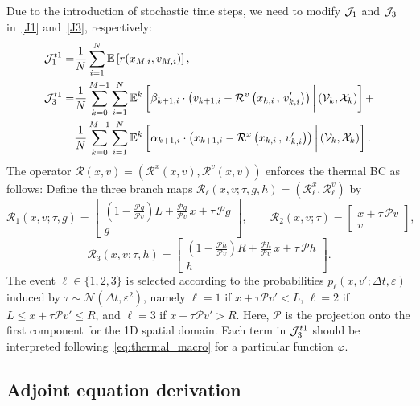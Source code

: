 \documentclass[12pt,nopreprintline]{elsarticle}
\begin{document}
Due to the introduction of stochastic time steps, we need to modify $\mathcal J_1$ and $\mathcal J_3$ in~\eqref{J1} and~\eqref{J3}, respectively:
\begin{align}
\mathcal J_1^{t1} = & \frac{1}{N} \sum_{i=1}^N  \mathbb{E} \left[ r( x_{M,i}, v_{M,i}) \right] \label{eq:J1_T1} ,  \\
\mathcal J_{3}^{t1} = & \frac{1}{N}\sum_{k=0}^{M-1} \sum_{i=1}^N  \mathbb{E}^k \left[  \beta_{k+1,i}  \cdot  \left( v_{k+1,i}   -  \mathcal{R}^v \left( x_{k,i}\,,\, v_{k,i}'  \right) \right)   \bigg| \left( \mathcal V_{k}, \mathcal X_k \right) \right] +  \label{eq:J3_T1}  \\
&   \frac{1}{N}\sum_{k=0}^{M-1} \sum_{i=1}^N  \mathbb{E}^k \left[ \alpha_{k+1,i}  \cdot \left(  x_{k+1,i}   -  \mathcal{R}^x \left( x_{k,i}\,,\, v_{k,i}'  \right) \right)   \bigg|  \left( \mathcal V_{k}, \mathcal X_k \right)  \right] . \nonumber
\end{align}
The operator $\mathcal R(x,v)=(\mathcal R^x(x,v),\mathcal R^v(x,v))$ enforces the thermal BC as follows: Define the three branch maps $\mathcal R_\ell(x,v;\tau,g,h)=(\mathcal R^x_\ell,\mathcal R^v_\ell)$ by
\[
\mathcal R_1(x,v;\tau,g)=
\begin{bmatrix}
\left(1-\frac{\mathcal Pg}{\mathcal Pv}\right)L+\frac{\mathcal Pg}{\mathcal Pv}\,x+\tau\,\mathcal Pg\\[0.2em]
g
\end{bmatrix},\qquad
\mathcal R_2(x,v;\tau)=
\begin{bmatrix}
x+\tau\,\mathcal Pv\\ v
\end{bmatrix},
\]
\[
\mathcal R_3(x,v;\tau,h)=
\begin{bmatrix}
\left(1-\frac{\mathcal Ph}{\mathcal Pv}\right)R+\frac{\mathcal Ph}{\mathcal Pv}\,x+\tau\,\mathcal Ph\\[0.2em]
h
\end{bmatrix}.
\]
The event $\ell\in\{1,2,3\}$ is selected according to the probabilities $p_\ell(x,v';\Delta t,\varepsilon)$ induced by $\tau\sim\mathcal N(\Delta t,\varepsilon^2)$, namely $\ell=1$ if $x+\tau\mathcal Pv'<L$, $\ell=2$ if $L\le x+\tau\mathcal Pv'\le R$, and $\ell=3$ if $x+\tau\mathcal Pv'>R$.
Here, $\mathcal{P}$ is the projection onto the first component for the 1D spatial domain. Each term in $\mathcal J_{3}^{t1}$ should be interpreted following~\eqref{eq:thermal_macro} for a particular function $\varphi$.

\subsection{Adjoint equation derivation}
\end{document}
